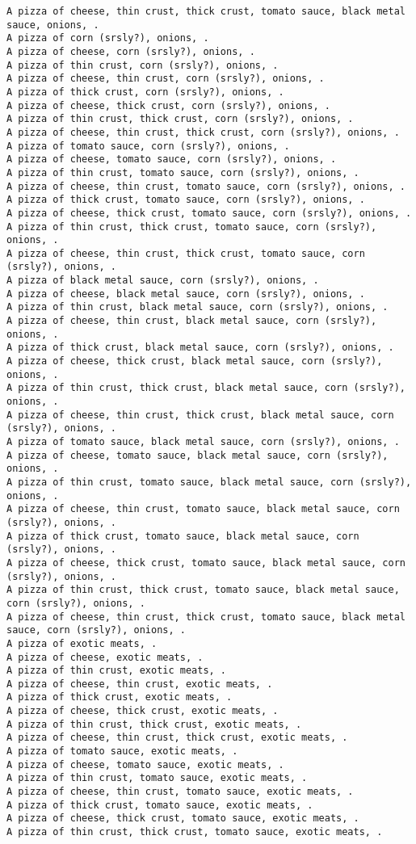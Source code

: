 \documentclass[11pt]{article}
\begin{document}
\begin{enumerate}
\begin{verbatim}
A pizza of cheese, thin crust, thick crust, tomato sauce, black metal sauce, onions, .
A pizza of corn (srsly?), onions, .
A pizza of cheese, corn (srsly?), onions, .
A pizza of thin crust, corn (srsly?), onions, .
A pizza of cheese, thin crust, corn (srsly?), onions, .
A pizza of thick crust, corn (srsly?), onions, .
A pizza of cheese, thick crust, corn (srsly?), onions, .
A pizza of thin crust, thick crust, corn (srsly?), onions, .
A pizza of cheese, thin crust, thick crust, corn (srsly?), onions, .
A pizza of tomato sauce, corn (srsly?), onions, .
A pizza of cheese, tomato sauce, corn (srsly?), onions, .
A pizza of thin crust, tomato sauce, corn (srsly?), onions, .
A pizza of cheese, thin crust, tomato sauce, corn (srsly?), onions, .
A pizza of thick crust, tomato sauce, corn (srsly?), onions, .
A pizza of cheese, thick crust, tomato sauce, corn (srsly?), onions, .
A pizza of thin crust, thick crust, tomato sauce, corn (srsly?), onions, .
A pizza of cheese, thin crust, thick crust, tomato sauce, corn (srsly?), onions, .
A pizza of black metal sauce, corn (srsly?), onions, .
A pizza of cheese, black metal sauce, corn (srsly?), onions, .
A pizza of thin crust, black metal sauce, corn (srsly?), onions, .
A pizza of cheese, thin crust, black metal sauce, corn (srsly?), onions, .
A pizza of thick crust, black metal sauce, corn (srsly?), onions, .
A pizza of cheese, thick crust, black metal sauce, corn (srsly?), onions, .
A pizza of thin crust, thick crust, black metal sauce, corn (srsly?), onions, .
A pizza of cheese, thin crust, thick crust, black metal sauce, corn (srsly?), onions, .
A pizza of tomato sauce, black metal sauce, corn (srsly?), onions, .
A pizza of cheese, tomato sauce, black metal sauce, corn (srsly?), onions, .
A pizza of thin crust, tomato sauce, black metal sauce, corn (srsly?), onions, .
A pizza of cheese, thin crust, tomato sauce, black metal sauce, corn (srsly?), onions, .
A pizza of thick crust, tomato sauce, black metal sauce, corn (srsly?), onions, .
A pizza of cheese, thick crust, tomato sauce, black metal sauce, corn (srsly?), onions, .
A pizza of thin crust, thick crust, tomato sauce, black metal sauce, corn (srsly?), onions, .
A pizza of cheese, thin crust, thick crust, tomato sauce, black metal sauce, corn (srsly?), onions, .
A pizza of exotic meats, .
A pizza of cheese, exotic meats, .
A pizza of thin crust, exotic meats, .
A pizza of cheese, thin crust, exotic meats, .
A pizza of thick crust, exotic meats, .
A pizza of cheese, thick crust, exotic meats, .
A pizza of thin crust, thick crust, exotic meats, .
A pizza of cheese, thin crust, thick crust, exotic meats, .
A pizza of tomato sauce, exotic meats, .
A pizza of cheese, tomato sauce, exotic meats, .
A pizza of thin crust, tomato sauce, exotic meats, .
A pizza of cheese, thin crust, tomato sauce, exotic meats, .
A pizza of thick crust, tomato sauce, exotic meats, .
A pizza of cheese, thick crust, tomato sauce, exotic meats, .
A pizza of thin crust, thick crust, tomato sauce, exotic meats, .



\end{verbatim}
\end{enumerate}
\end{document}
